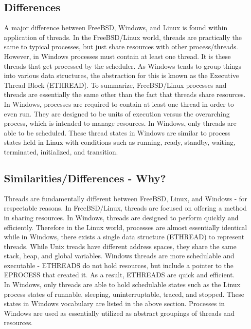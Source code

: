 \documentclass[letterpaper,10pt,titlepage]{article}
\begin{document}


\subsection{Differences}

A major difference between FreeBSD, Windows, and Linux is found within application of threads.  In the FreeBSD/Linux world, threads are practically the same to typical processes, but just share resources with other process/threads.  However, in Windows processes must contain at least one thread.  It is these threads that get processed by the scheduler.  As Windows tends to group things into various data structures, the abstraction for this is known as the Executive Thread Block (ETHREAD).  To summarize, FreeBSD/Linux processes and threads are essentially the same other than the fact that threads share resources.  In Windows, processes are required to contain at least one thread in order to even run.  They are designed to be units of execution versus the overarching process, which is intended to manage resources.\cite{mwi5}  In Windows, only threads are able to be scheduled.  These thread states in Windows are similar to process states held in Linux with conditions such as running, ready, standby, waiting, terminated, initialized, and transition.\cite{lkd4}\\

\subsection{Similarities/Differences - Why?}

Threads are fundamentally different between FreeBSD, Linux, and Windows - for respectable reasons.  In FreeBSD/Linux, threads are focused on offering a method in sharing resources.  In Windows, threads are designed to perform quickly and efficiently.  Therefore in the Linux world, processes are almost essentially identical while in Windows, there exists a single data structure (ETHREAD) to represent threads.  While Unix treads have different address spaces, they share the same stack, heap, and global variables.  Windows threads are more schedulable and executable - ETHREADS do not hold resources, but include a pointer to the EPROCESS that created it.\cite{mwi5}  As a result, ETHREADS are quick and efficient.\\

In Windows, only threads are able to hold schedulable states such as the Linux process states of runnable, sleeping, uninterruptable, traced, and stopped.  These states in Windows vocabulary are listed in the above section.  Processes in Windows are used as essentially utilized as abstract groupings of threads and resources.\\
\end{document}
